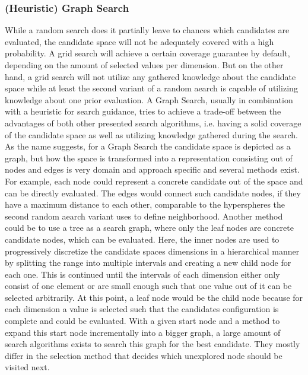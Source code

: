 \subsubsection{(Heuristic) Graph Search}
\label{sec:theory:optimization:graph}
While a random search does it partially leave to chances which candidates are evaluated, the candidate space will not be adequately covered with a high probability.
A grid search will achieve a certain coverage guarantee by default, depending on the amount of selected values per dimension.
But on the other hand, a grid search will not utilize any gathered knowledge about the candidate space while at least the second variant of a random aearch is capable of utilizing knowledge about one prior evaluation.\newline
A Graph Search, usually in combination with a heuristic for search guidance, tries to achieve a trade-off between the advantages of both other presented search algorithms, i.e. having a solid coverage of the candidate space as well as utilizing knowledge gathered during the search.
As the name suggests, for a Graph Search the candidate space is depicted as a graph, but how the space is transformed into a representation consisting out of nodes and edges is very domain and approach specific and several methods exist.
For example, each node could represent a concrete candidate out of the space and can be directly evaluated.
The edges would connect such candidate nodes, if they have a maximum distance to each other, comparable to the hyperspheres the second random aearch variant uses to define neighborhood.\newline
Another method could be to use a tree as a search graph, where only the leaf nodes are concrete candidate nodes, which can be evaluated.
Here, the inner nodes are used to progressively discretize the candidate spaces dimensions in a hierarchical manner by splitting the range into multiple intervals and creating a new child node for each one.
This is continued until the intervals of each dimension either only consist of one element or are small enough such that one value out of it can be selected arbitrarily.
At this point, a leaf node would be the child node because for each dimension a value is selected such that the candidates configuration is complete and could be evaluated.\newline
With a given start node and a method to expand this start node incrementally into a bigger graph, a large amount of search algorithms exists to search this graph for the best candidate.
They mostly differ in the selection method that decides which unexplored node should be visited next.
